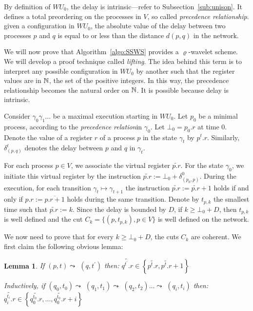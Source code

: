 \documentclass[11pt]{article}
\newtheorem{lemma}[theorem]{Lemma}
\begin{document}
By definition of $WU_0$, the delay is intrinsic---refer to Subsection~\ref{sub:unison}. 
It defines a total preordering  on the processes in $V$, so called \emph{precedence relationship}. 
given a configuration in $WU_0$, the absolute value of the delay between two processes  
$p$ and $q$ is equal to or less than the distance $d(p,q)$ in the network. 


We will now prove that Algorithm~\ref{algo:SSWS} provides a $\varrho$-wavelet scheme.  We will develop a proof technique 
called \emph{lifting}.  The idea behind this term is to interpret any possible configuration in $WU_0$ 
by another such that the register values are in $\Bbb{N}$, the set of the positive integers.  In this way, 
the precedence relationship becomes the natural order on $\Bbb{N}$. It is possible because delay is intrinsic.

Consider $\gamma _0 \gamma _1...$ be a maximal execution starting in $WU_0$.  
Let $p_{0}$ be a minimal process, according to the \emph{precedence relation}in $\gamma _{0}$. Let $\bot _0 = p_{0}.r$ at time $0$.
Denote the value of a register $r$ of a process $p$ in the state $\gamma_t$ by $p^t.r$. Similarly, $\delta^t_{(p,q)}$ denotes the delay between $p$ and $q$ in $\gamma_t$. 

For each process $p\in V$, we associate the virtual register $\widetilde{p.r}$. For the state $\gamma _{0}$,
we initiate this virtual register by  the instruction 
$\widetilde{p.r}:=\bot _{0}+\delta _{(p_{0},p)}^{0}$. During the execution, for each  transition $\gamma
_{t}\mapsto \gamma _{t+1}$ the instruction $\widetilde{p.r}:=\widetilde{p.r}+1$ holds 
if and only if $p.r:=\overline{p.r+1}$ holds during the same transition.
Denote by $t_{p,k}$ the smallest time such that $\widetilde{p.r}:=k$.  Since the delay is
bounded by $D$, if $k\geq \bot _{0}+ D$, then $t_{p,k}$ is well defined and the cut  $C_{k}=\{ (p,t_{p,k}),p\in V\}$ is well defined on the network.
 
We now need to prove that for every $k \geq \bot_0 +D$, the cuts $C_{k}$ are coherent.  We first claim the following obvious lemma:



\begin{lemma}
\label{lem:coherent}
If $\left( p,t\right) \leadsto $ $\left( q,t^{\prime }\right) $ then: 
$
\widetilde{q^{t^{\prime }}.r}\in \left\{ \widetilde{p^{t}.r},\widetilde{p^{t}.r}+1\right\} 
$
 
Inductively, if $\left( q_{0},t_{0}\right) \leadsto $
$\left( q_{1},t_{1}\right) \leadsto $ $\left( q_{2},t_{2}\right) ...\leadsto 
$ $\left( q_{i},t_{i}\right) $ then: 
$
\widetilde{q_{i}^{t_{i}}.r}\in \left\{ 
\widetilde{q_{0}^{t_{0}}.r},...,\widetilde{q_{0}^{t_{0}}.r}+i\right\}
$
\end{lemma}
\end{document}
